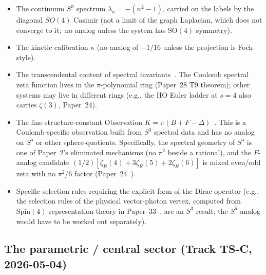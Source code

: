 \documentclass[twocolumn,pra,amsmath,amssymb,superscriptaddress]{revtex4-2}
\begin{document}
\begin{itemize}
\item The continuum $S^3$ spectrum $\lambda_n = -(n^2 - 1)$, carried on
  the labels by the diagonal $SO(4)$ Casimir (not a limit of the graph
  Laplacian, which does not converge to it;\ no analog unless the
  system has $\mathrm{SO}(4)$ symmetry).
\item The kinetic calibration $\kappa$ (no analog of $-1/16$
  unless the projection is Fock-style).
\item The transcendental content of spectral
  invariants~\cite{paper18,paper28}.  The Coulomb spectral zeta
  function lives in the $\pi$-polynomial ring (Paper~28 T9
  theorem); other systems may live in different rings (e.g., the HO
  Euler ladder at $s = 4$ also carries $\zeta(3)$, Paper~24).
\item The fine-structure-constant Observation
  $K = \pi(B + F - \Delta)$~\cite{paper2_alpha}.  This is a
  Coulomb-specific observation built from $S^3$ spectral data and has
  no analog on $S^5$ or other sphere-quotients.  Specifically, the
  spectral geometry of $S^5$ is one of Paper~2's eliminated mechanisms
  (no $\pi^2$ beside a rational), and the $F$-analog candidate
  $(1/2)[\zeta_R(4) + 3\zeta_R(5) + 2\zeta_R(6)]$ is mixed even/odd
  zeta with no $\pi^2/6$ factor (Paper~24~\cite{paper24}).
\item Specific selection rules requiring the explicit form of
  the Dirac operator (e.g., the selection rules of the physical
  vector-photon vertex, computed from
  $\mathrm{Spin}(4)$ representation theory in Paper~33~\cite{paper33},
  are an $S^3$ result; the $S^5$ analog would have to be worked out
  separately).
\end{itemize}

\subsection{The parametric / central sector (Track TS-C, 2026-05-04)}
\label{sec:parametric_central_sector}
\end{document}
